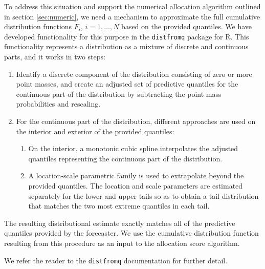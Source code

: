 \documentclass{article}
\begin{document}
To address this situation and support the numerical allocation algorithm outlined in section \ref{sec:numeric}, we need a mechanism to approximate the full cumulative distribution functions $F_i$, $i = 1, \ldots, N$ based on the provided quantiles. We have developed functionality for this purpose in the \verb`distfromq` package for R.\citep{ray-distfromq} This functionality represents a distribution as a mixture of discrete and continuous parts, and it works in two steps:
\begin{enumerate}
  \item Identify a discrete component of the distribution consisting of zero or more point masses, and create an adjusted set of predictive quantiles for the continuous part of the distribution by subtracting the point mass probabilities and rescaling.
  \item For the continuous part of the distribution, different approaches are used on the interior and exterior of the provided quantiles:
  \begin{enumerate}
    \item On the interior, a monotonic cubic spline interpolates the adjusted quantiles representing the continuous part of the distribution.
    \item A location-scale parametric family is used to extrapolate beyond the provided quantiles. The location and scale parameters are estimated separately for the lower and upper tails so as to obtain a tail distribution that matches the two most extreme quantiles in each tail.
  \end{enumerate}
\end{enumerate}
The resulting distributional estimate exactly matches all of the predictive quantiles provided by the forecaster. We use the cumulative distribution function resulting from this procedure as an input to the allocation score algorithm.

We refer the reader to the \verb`distfromq` documentation for further detail.\citep{ray-distfromq}
\end{document}
